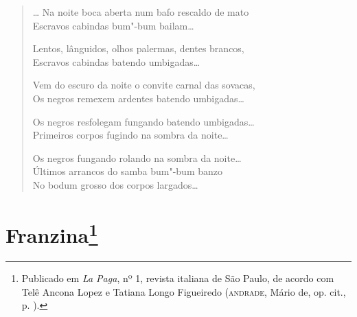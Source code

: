 \begin{verse}
\ldots{} Na noite boca aberta num bafo rescaldo de mato\\
Escravos cabindas bum"-bum bailam\ldots{}

Lentos, lânguidos, olhos palermas, dentes brancos,\\
Escravos cabindas batendo umbigadas\ldots{}

Vem do escuro da noite o convite carnal das sovacas,\\
Os negros remexem ardentes batendo umbigadas\ldots{}

Os negros resfolegam fungando batendo umbigadas\ldots{}\\
Primeiros corpos fugindo na sombra da noite\ldots{}

Os negros fungando rolando na sombra da noite\ldots{}\\
Últimos arrancos do samba bum"-bum banzo\\
No bodum grosso dos corpos largados\ldots{}
\end{verse}

\chapter[Franzina]{Franzina\footnote[*]{Publicado em \emph{La Paga}, nº 1, revista
  italiana de São Paulo, de acordo com Telê Ancona Lopez e Tatiana Longo
  Figueiredo (\textsc{andrade}, Mário de, op. cit., p. ).}}

